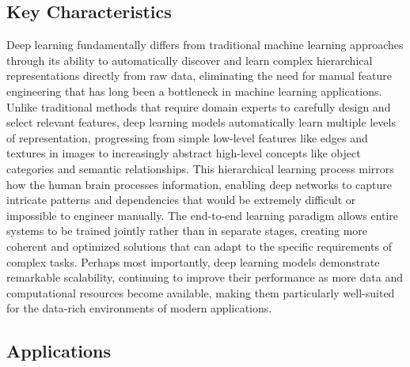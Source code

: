 \subsection{Key Characteristics}

Deep learning fundamentally differs from traditional machine learning approaches through its ability to automatically discover and learn complex hierarchical representations directly from raw data, eliminating the need for manual feature engineering that has long been a bottleneck in machine learning applications. Unlike traditional methods that require domain experts to carefully design and select relevant features, deep learning models automatically learn multiple levels of representation, progressing from simple low-level features like edges and textures in images to increasingly abstract high-level concepts like object categories and semantic relationships. This hierarchical learning process mirrors how the human brain processes information, enabling deep networks to capture intricate patterns and dependencies that would be extremely difficult or impossible to engineer manually. The end-to-end learning paradigm allows entire systems to be trained jointly rather than in separate stages, creating more coherent and optimized solutions that can adapt to the specific requirements of complex tasks. Perhaps most importantly, deep learning models demonstrate remarkable scalability, continuing to improve their performance as more data and computational resources become available, making them particularly well-suited for the data-rich environments of modern applications.

\subsection{Applications}

